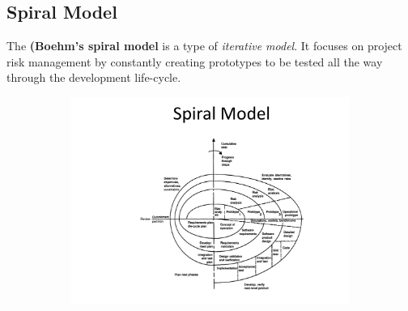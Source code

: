 \documentclass[a4paper]{report}
\begin{document}
\subsection{Spiral Model}
The \textbf{(Boehm's spiral model} is a type of \textit{iterative model}. It focuses on project risk management by constantly creating prototypes to be tested all the way through the development life-cycle.

\begin{figure}[H]
\hskip-2.5cm\begin{subfigure}{1.2\textwidth}
  \includegraphics[width=1.2\linewidth]
  {images/3-spiral.png}
\end{subfigure}
\end{figure}
\end{document}
